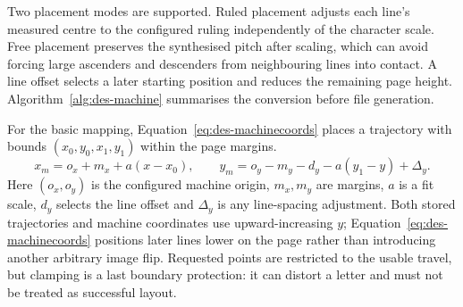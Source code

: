 Two placement modes are supported. Ruled placement adjusts each line's measured centre to the configured ruling independently of the character scale. Free placement preserves the synthesised pitch after scaling, which can avoid forcing large ascenders and descenders from neighbouring lines into contact. A line offset selects a later starting position and reduces the remaining page height. Algorithm~\ref{alg:des-machine} summarises the conversion before file generation.
\begin{designalgorithm}
\caption{Trajectory placement and motion-file preparation}
\label{alg:des-machine}
\begin{designpseudo}
\end{designpseudo}
\end{designalgorithm}

For the basic mapping, Equation~\ref{eq:des-machinecoords} places a trajectory with bounds $(x_0,y_0,x_1,y_1)$ within the page margins.
\begin{equation}
x_m=o_x+m_x+a(x-x_0),\qquad
y_m=o_y-m_y-d_y-a(y_1-y)+\Delta_y.
\label{eq:des-machinecoords}
\end{equation}
Here $(o_x,o_y)$ is the configured machine origin, $m_x,m_y$ are margins, $a$ is a fit scale, $d_y$ selects the line offset and $\Delta_y$ is any line-spacing adjustment. Both stored trajectories and machine coordinates use upward-increasing $y$; Equation~\ref{eq:des-machinecoords} positions later lines lower on the page rather than introducing another arbitrary image flip. Requested points are restricted to the usable travel, but clamping is a last boundary protection: it can distort a letter and must not be treated as successful layout.

